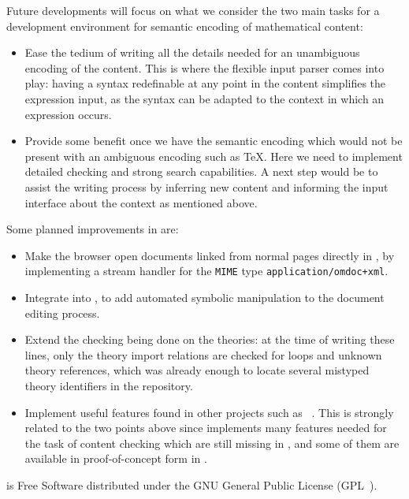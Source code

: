 Future developments will focus on what we consider the two main tasks for a development
environment for semantic encoding of mathematical content:
\begin{itemize}
\item Ease the tedium of writing all the details needed for an unambiguous encoding of the
  content.  This is where the flexible input parser comes into play: having a syntax
  redefinable at any point in the content simplifies the expression input, as the syntax
  can be adapted to the context in which an expression occurs.
\item Provide some benefit once we have the semantic encoding which would not be present
  with an ambiguous encoding such as {\TeX}.  Here we need to implement detailed checking
  and strong search capabilities.  A next step would be to assist the writing process by
  inferring new content and informing the input interface about the context as mentioned
  above.
\end{itemize}

Some planned improvements in {\sentido} are:
\begin{itemize}
\item Make the browser open {\omdoc} documents linked from normal pages directly in
  {\sentido}, by implementing a stream handler for the {\tt{MIME}} type
  {\tt{application/omdoc+xml}}.
\item Integrate {\algebra} into {\sentido}, to add automated symbolic manipulation to the
  document editing process.
\item Extend the checking being done on the theories: at the time of writing these lines,
  only the theory import relations are checked for loops and unknown theory references,
  which was already enough to locate several mistyped theory identifiers in the {\omdoc}
  repository.
\item Implement useful features found in other projects such as
  {\theorema}~\cite{piroi04environment}.  This is strongly related to the two points above
  since {\theorema} implements many features needed for the task of content checking which
  are still missing in {\sentido}, and some of them are available in proof-of-concept form
  in {\algebra}.
\end{itemize}

{\sentido} is Free Software distributed under the GNU General Public License
(GPL~\cite{GPL}).



